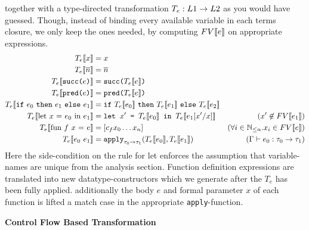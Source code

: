 together with a type-directed transformation $T_e : L1 \rightarrow L2$
as you would have guessed.
Though, instead of binding every available variable in each terms closure,
we only keep the ones needed, by computing $FV\llbracket e \rrbracket$ on appropriate expressions.
\begin{align*}
  T_e\LB\text{$x$}\RB &= x\\
  T_e\LB\text{$\overline n$}\RB &= \overline n\\
  T_e\LB\text{\tt succ($e$)}\RB &= \text{\tt succ($T_e\LB{e}\RB$)}\\
  T_e\LB\text{\tt pred($e$)}\RB &= \text{\tt pred($T_e\LB{e}\RB$)}\\
  T_e\LB\IF{e_0}{e_1}{e_1}\RB &= \IF{T_e\LB{e_0}\RB}{T_e\LB{e_1}\RB}{T_e\LB{e_2}\RB}\\
  T_e\LB\text{let $x$ = $e_0$ in $e_1$}\RB &=
  \text{\tt let $x'$ = $T_e\LB{e_0}\RB$ in $T_e\LB{e_1[x'/x]}\RB$} &\text{\hfill}(x' \not\in FV\LB{e_1}\RB)\\
  T_e\LB\text{fun $f$ $x$ = $e$}\RB &=
  [c_f x_0 \dots x_n] &(\forall i \in \N_{\leq n}. x_i \in FV\LB{e}\RB)\\
  T_e\LB{e_0\ e_1}\RB &= \text{\tt apply}_{\tau_{0} \TO \tau_{1}} (T_e\LB{e_0}\RB, T_e\LB{e_1}\RB)
  & (\Gamma\vdash e_0 : \tau_0 \TO \tau_1)
\end{align*}
Here the side-condition on the rule for let enforces the assumption that
variable-names are unique from the analysis section.
Function definition expressions are translated into new datatype-constructors
which we generate after the $T_e$ has been fully applied.
additionally the body $e$ and formal parameter $x$ of each function
is lifted a match case in the appropriate {\tt apply}-function.

{\bf Control Flow Based Transformation}

